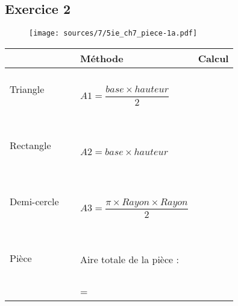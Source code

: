 \documentclass[10pt]{article}
\begin{document}

\begin{minipage}{0.3\linewidth}
  \subsection*{Exercice 2}
  \begin{figure}[H]
    \centering
    \texttt{[image: sources/7/5ie\_ch7\_piece-1a.pdf]}
  \end{figure}
  
\end{minipage}
\begin{minipage}{0.7\linewidth}


  \begin{center}
    \begin{tabular}{| l | l | c |}
      \hline
      &    Méthode &   Calcul \\ 
      \hline
      Triangle $\phantom{\dfrac{\dfrac{0}{0}}{\dfrac{\dfrac{0}{0}}{0}}}$ 
		  & $A1 = \dfrac{base \times hauteur}{2}$           & \phantom{\hspace{6cm}}\\
      \hline
      Rectangle $\phantom{\dfrac{\dfrac{0}{0}}{\dfrac{\dfrac{0}{0}}{0}}}$ 
      & $A2 = base \times hauteur$                      & \\
      \hline 
      Demi-cercle $\phantom{\dfrac{\dfrac{0}{0}}{\dfrac{\dfrac{0}{0}}{0}}}$ 
      & $A3 = \dfrac{\pi \times Rayon \times Rayon}{2}$ & \\
      \hline
      Pièce $\phantom{\dfrac{\dfrac{0}{0}}{\dfrac{0}{0}}}$ 
      & Aire totale de la pièce :                              & \\
      & =   \\
      \hline
    \end{tabular}
  \end{center}


\end{minipage}
\end{document}

